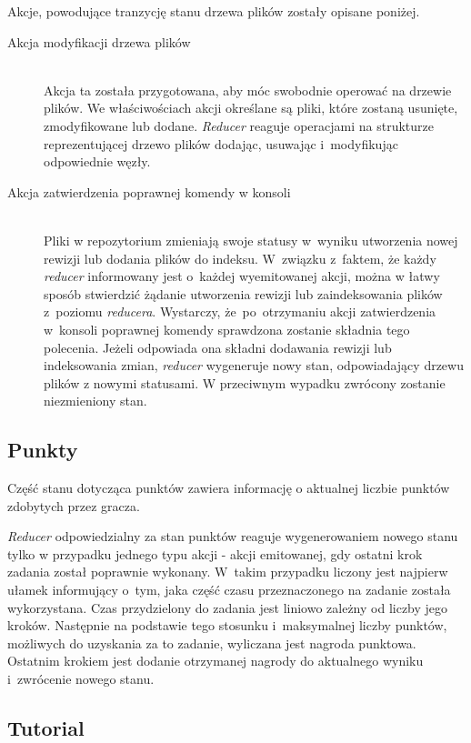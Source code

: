 \documentclass[12pt,a4paper,polish,thesis]{dcsbook}
\begin{document}
{	Akcje, powodujące tranzycję stanu drzewa plików zostały opisane poniżej.
	
	\begin{description}
	\item[Akcja modyfikacji drzewa plików] \hfill \\
	Akcja ta została przygotowana, aby móc swobodnie operować na drzewie plików. We właściwościach akcji określane są pliki, które zostaną usunięte, zmodyfikowane lub dodane. \textit{Reducer} reaguje operacjami na strukturze reprezentującej drzewo plików dodając, usuwając i~modyfikując odpowiednie węzły.
	
	\item[Akcja zatwierdzenia poprawnej komendy w konsoli] \hfill \\
	Pliki w repozytorium zmieniają swoje statusy w~wyniku utworzenia nowej rewizji lub dodania plików do indeksu. W~związku z~faktem, że każdy \textit{reducer} informowany jest o~każdej wyemitowanej akcji, można w łatwy sposób stwierdzić żądanie utworzenia rewizji lub zaindeksowania plików z~poziomu \textit{reducera}. Wystarczy, że~po~otrzymaniu akcji zatwierdzenia w~konsoli poprawnej komendy sprawdzona zostanie składnia tego polecenia. Jeżeli odpowiada ona składni dodawania rewizji lub indeksowania zmian, \textit{reducer} wygeneruje nowy stan, odpowiadający drzewu plików z nowymi statusami. W przeciwnym wypadku zwrócony zostanie niezmieniony stan.
	\end{description}
	
	\subsection{Punkty}
	
	Część stanu dotycząca punktów zawiera informację o aktualnej liczbie punktów zdobytych przez gracza.
	
	\textit{Reducer} odpowiedzialny za stan punktów reaguje wygenerowaniem nowego stanu tylko w przypadku jednego typu akcji - akcji emitowanej, gdy ostatni krok zadania został poprawnie wykonany. W~takim przypadku liczony jest najpierw ułamek informujący o~tym, jaka część czasu przeznaczonego na zadanie została wykorzystana. Czas przydzielony do zadania jest liniowo zależny od liczby jego kroków. Następnie na podstawie tego stosunku i~maksymalnej liczby punktów, możliwych do uzyskania za to zadanie, wyliczana jest nagroda punktowa. Ostatnim krokiem jest dodanie otrzymanej nagrody do aktualnego wyniku i~zwrócenie nowego stanu.
	
	\subsection{Tutorial} \label{TutorialStan}
	
}
\end{document}

